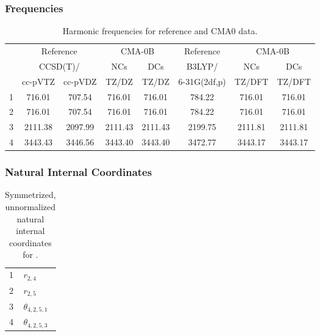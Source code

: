 \documentclass[10pt,oneside]{article}
\begin{document}
\clearpage

\subsubsection*{Frequencies}
\begin{table}[h!]
\centering
\caption{Harmonic frequencies for reference and CMA0 data.}
\begin{tabular}{cccccccc}
\toprule
{} & \multicolumn{2}{c}{Reference} & \multicolumn{2}{c}{CMA-0B} &    Reference & \multicolumn{2}{c}{CMA-0B} \\
{} & \multicolumn{2}{c}{CCSD(T)/} &     NCs &     DCs &       B3LYP/ &     NCs &     DCs \\
{} &   cc-pVTZ & cc-pVDZ &   TZ/DZ &   TZ/DZ & 6-31G(2df,p) &  TZ/DFT &  TZ/DFT \\
\midrule
1 &    716.01 &  707.54 &  716.01 &  716.01 &       784.22 &  716.01 &  716.01 \\
2 &    716.01 &  707.54 &  716.01 &  716.01 &       784.22 &  716.01 &  716.01 \\
3 &   2111.38 & 2097.99 & 2111.43 & 2111.43 &      2199.75 & 2111.81 & 2111.81 \\
4 &   3443.43 & 3446.56 & 3443.40 & 3443.40 &      3472.77 & 3443.17 & 3443.17 \\
\bottomrule
\end{tabular}
\end{table}

\clearpage

\subsubsection*{Natural Internal Coordinates}
\begin{table}[h!]
\centering
\caption{Symmetrized, unnormalized natural internal coordinates for .}
\small
\begin{tabular}{ll}
  1   & $r_{2,4}$ \\
  2   & $r_{2,5}$ \\
  3   & $\theta_{4,2,5,1}$ \\
  4   & $\theta_{4,2,5,3}$ \\
\end{tabular}
\end{table}

\clearpage

\subsection{\ \ \ }
\end{document}
